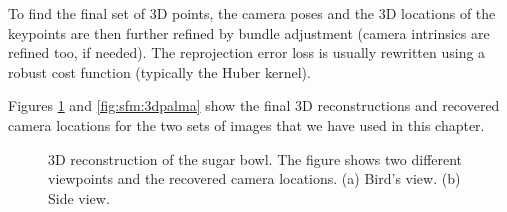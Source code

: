 To find the final set of 3D points,  the camera poses and the 3D locations of the keypoints are then further refined by bundle adjustment (camera intrinsics are refined too, if needed). The reprojection error loss is usually rewritten using a robust cost function (typically the Huber kernel).

Figures \ref{fig:sfm:3dsugar} and \ref{fig:sfm:3dpalma} show the final 3D reconstructions and recovered camera locations for the two sets of images that we have used in this chapter.


\begin{figure}
    \centerline{
    }
    \caption{3D reconstruction of the sugar bowl. The figure shows two different viewpoints and the recovered camera locations. (a) Bird's view. (b) Side view.}
    \label{fig:sfm:3dsugar}
\end{figure}




